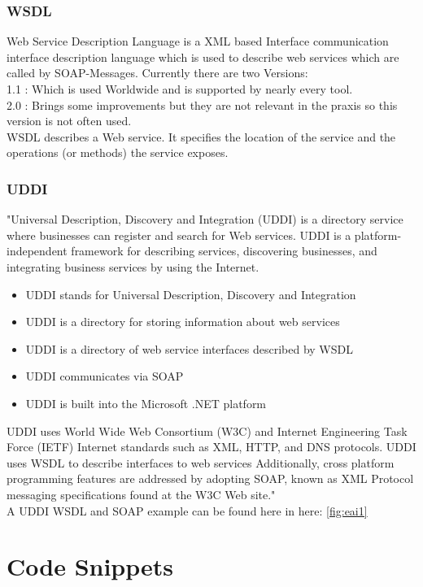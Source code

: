 \documentclass[12pt]{article}
\begin{document}
\subsubsection{WSDL}
Web Service Description Language is a XML based Interface communication interface description language
which is used to describe web services which are called by SOAP-Messages.
Currently there are two Versions:\\
1.1 : Which is used Worldwide and is supported by nearly every tool. \\
2.0 : Brings some improvements but they are not relevant in the praxis so this version is not often
used.\\
WSDL describes a Web service. It specifies the location of the service and the operations (or methods) the service exposes.\\
\cite{wsdl}\newpage
\subsubsection{UDDI}
"Universal Description, Discovery and Integration (UDDI) is a directory service where businesses can register and search for Web services.
UDDI is a platform-independent framework for describing services, discovering businesses, and integrating business services by using the Internet.\\
\begin{itemize}
\item UDDI stands for Universal Description, Discovery and Integration
\item UDDI is a directory for storing information about web services
\item UDDI is a directory of web service interfaces described by WSDL
\item UDDI communicates via SOAP
\item UDDI is built into the Microsoft .NET platform
\end{itemize}
UDDI uses World Wide Web Consortium (W3C) and Internet Engineering Task Force (IETF) Internet standards such as XML, HTTP, and DNS protocols.
UDDI uses WSDL to describe interfaces to web services Additionally, cross platform programming features are addressed by adopting SOAP, known as XML Protocol messaging specifications found at the W3C Web site."\cite{uddi}\\
A UDDI WSDL and SOAP example can be found here in here: \ref{fig:eai1}
\section{Code Snippets}
\end{document}
